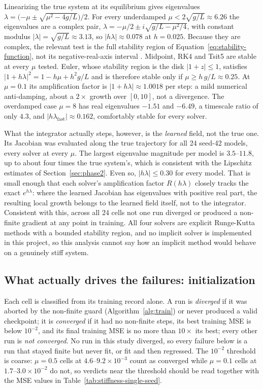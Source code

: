 Linearizing the true system at its equilibrium gives eigenvalues
$\lambda = \big({-\mu\pm\sqrt{\mu^2-4g/L}}\big)/2$. For every underdamped
$\mu<2\sqrt{g/L}\approx6.26$ the eigenvalues are a complex pair,
$\lambda=-\mu/2\pm i\sqrt{g/L-\mu^2/4}$, with constant modulus
$|\lambda|=\sqrt{g/L}\approx3.13$, so $|h\lambda|\approx0.078$ at $h=0.025$.
Because they are complex, the relevant test is the full stability region of
Equation~\ref{eq:stability-function}, not its negative-real-axis interval
\cite{hairer1996solving}. Midpoint, RK4 and Tsit5 are stable at every $\mu$
tested. Euler, whose stability region is the disk $|1+z|\le1$, satisfies
$|1+h\lambda|^2=1-h\mu+h^2g/L$ and is therefore stable only if
$\mu\ge h\,g/L\approx0.25$. At $\mu=0.1$ its amplification factor is
$|1+h\lambda|\approx1.0018$ per step: a mild numerical anti-damping, about a
$2\times$ growth over $[0,10]$, not a divergence. The overdamped case $\mu=8$
has real eigenvalues $-1.51$ and $-6.49$, a timescale ratio of only $4.3$, and
$|h\lambda_{\text{fast}}|\approx0.162$, comfortably stable for every solver.

What the integrator actually steps, however, is the \emph{learned} field,
not the true one. Its Jacobian was evaluated along the true trajectory for
all 24 seed-42 models, every solver at every $\mu$. The largest eigenvalue
magnitude per model is $3.5$--$11.8$, up to about four times the true
system's, which is consistent with the Lipschitz estimates of
Section~\ref{sec:phase2}. Even so, $|h\lambda|\le0.30$ for every model. That is
small enough that each solver's amplification factor $R(h\lambda)$ closely
tracks the exact $e^{h\lambda}$: where the learned Jacobian has eigenvalues
with positive real part, the resulting local growth belongs to the learned
field itself, not to the integrator. Consistent with this, across all 24
cells not one run diverged or produced a non-finite gradient at any point in
training. All four solvers are explicit Runge-Kutta methods
with a bounded stability region, and no implicit solver is implemented in
this project, so this analysis cannot say how an implicit method would
behave on a genuinely stiff system.

\subsection{What actually drives the failures: initialization}

Each cell is classified from its training record alone. A run is
\emph{diverged} if it was aborted by the non-finite guard
(Algorithm~\ref{alg:train}) or never produced a valid checkpoint; it is \emph{converged} if it had no non-finite
steps, its best training MSE is below $10^{-2}$, and its final training MSE
is no more than $10\times$ its best; every other run is \emph{not
converged}. No run in this study diverged, so every failure below is a run
that stayed finite but never fit, or fit and then regressed. The $10^{-2}$
threshold is coarse: $\mu=0.5$ cells at $4.6$--$9.2\times10^{-3}$ count as
converged while $\mu=0.1$ cells at $1.7$--$3.0\times10^{-2}$ do not, so
verdicts near the threshold should be read together with the MSE values in
Table~\ref{tab:stiffness-single-seed}.

